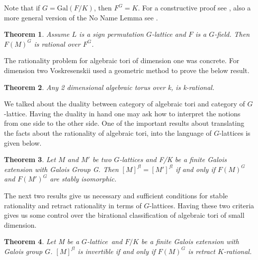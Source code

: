 \documentclass{article}
\theoremstyle{plain}
\newtheorem{theorem}{Theorem}
\theoremstyle{definition}
\newcommand{\G}{G}
\newcommand{\glat}{$G$-lattice}
\begin{document}
\noindent
Note that if $\G = \mathrm{Gal} (F/K)$, then $F^\G = K$. For a constructive proof see 
\cite{Armin}, also a more general version of the No Name Lemma see \cite{Domokos}.
\begin{theorem}\cite[Proposition 9.5.1]{Lorenz}\label{SignPermRational}
Assume $L$ is a sign permutation $G$-lattice and $F$ is a $G$-field. Then $F(M)^G$ 
is rational over $F^G$.
\end{theorem}
\noindent
The rationality problem for algebraic tori of dimension one was concrete. For 
dimension two Voskresenskii used a geometric method to prove the below result. 
\begin{theorem}
\cite{Vos67} Any 2 dimensional algebraic torus over k, is k-rational.
\end{theorem} 
\noindent
We talked about the duality between category of algebraic tori and category of \glat . 
Having the duality in hand one may ask how to interpret the notions from one side to 
the other side. One of the important results about translating the facts about the 
rationality of algebraic tori, into the language of \glat s is given below.
\begin{theorem}\cite{Vos74}
Let $M$ and $M'$ be two \glat s  and F/K be a finite Galois extension with Galois 
Group \G . Then $[M]^{fl}=[M']^{fl}$ if and only if $ F(M)^\G $ and $ F(M')^\G$ are 
stably isomorphic.
\end{theorem}
\noindent
The next two results give us necessary and sufficient conditions for stable rationality 
and retract rationality in terms of \glat  s. Having these two criteria gives us some 
control over the birational classification of algebraic tori of small dimension.
\begin{theorem}\cite[Theorem 9.5.4]{Lorenz} Let M be a \glat \,
and $F/K$ be a finite Galois extension with Galois group $G$. $[M]^{fl}$ is invertible 
if and only if $F(M)^\G$ is retract $K$-rational.
\end{theorem}
\end{document}
